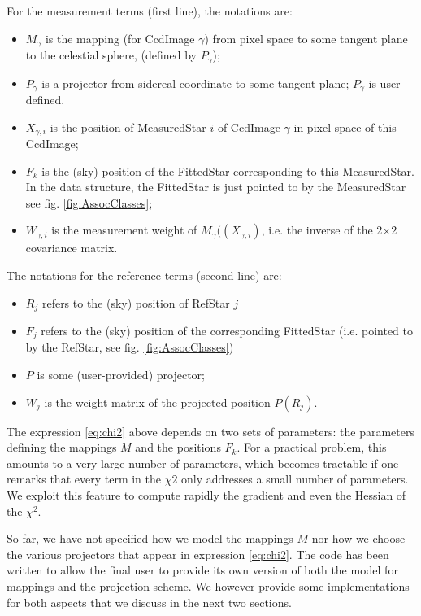 \documentclass[a4paper,12pt]{scrartcl}
\begin{document}
For the measurement terms (first line), the notations are:
\begin{itemize}
\item $M_\gamma$ is the mapping (for CcdImage $\gamma$) from pixel space to
some tangent plane to the celestial sphere, (defined by $P_\gamma$);
\item $P_\gamma$ is a projector from sidereal coordinate to some tangent plane;
$P_\gamma$ is user-defined.
\item $X_{\gamma,i}$ is the position of MeasuredStar $i$ of CcdImage $\gamma$
in pixel space of this CcdImage;
\item $F_k$ is the (sky) position of the FittedStar corresponding 
to this MeasuredStar. In the data structure, the FittedStar is just pointed to 
by the MeasuredStar see fig. \ref{fig:AssocClasses};
\item $W_{\gamma,i}$ is the measurement weight of $M_\gamma((X_{\gamma,i})$, i.e.
the inverse of the 2$\times$2 covariance matrix.
\end{itemize}

The notations for the reference terms (second line) are:
\begin{itemize}
\item $R_j$ refers to the (sky) position of RefStar $j$
\item $F_j$ refers to the (sky) position of the corresponding
FittedStar (i.e. pointed to by the RefStar, see fig. \ref{fig:AssocClasses})
\item $P$ is some (user-provided) projector;
\item $W_j$ is the weight matrix of the projected position $P(R_j)$. 
\end{itemize}

The expression \ref{eq:chi2} above depends on two sets of parameters:
the parameters defining the mappings $M$ and the positions $F_k$.
For a practical problem, this amounts to a very large number of parameters,
which becomes tractable if one remarks that every term in the $\chi2$ 
only addresses a small number of parameters. We exploit this feature 
to compute rapidly the gradient and even the Hessian of the $\chi^2$.

So far, we have not specified how
we model the mappings $M$ nor how we choose the various projectors 
that appear in expression \ref{eq:chi2}. The code has been written
to allow the final user to provide its own version of both the model
for mappings and the projection scheme. We however provide some 
implementations for both aspects that we discuss in the next two sections.
\end{document}
